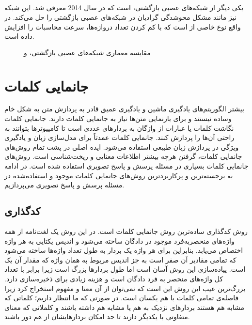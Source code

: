 \subsection{}
	یکی دیگر از شبکه‌های عصبی بازگشتی، 
	\cite{cho2014learning}
	است که در سال 2014 معرفی شد. این شبکه نیز مانند 
	مشکل محوشدگی گرادیان در شبکه‌های عصبی بازگشتی را حل می‌کند. در واقع 
	نوع خاصی از 
	است که با کم کردن تعداد دروازه‌ها، سرعت محاسبات را افزایش داده است.
	 \begin{figure}
	 	\caption[مقایسه معماری شبکه‌‌های عصبی بازگشتی،  و ]{مقایسه معماری شبکه‌‌های عصبی بازگشتی،  و \cite{rnn}}
	 	\label{fig:RNN-LSTM-GRU}
	 \end{figure}

\section{جانمایی کلمات}
	بیشتر الگوریتم‌های یادگیری ماشین و یادگیری عمیق  قادر به پردازش متن به شکل خام وساده نیستند  و برای بازنمایی متن‌ها نیاز به جانمایی کلمات 
	دارند. جانمایی کلمات نگاشت کلمات یا عبارات از واژگان به بردارهای عددی است تا کامپیوترها بتوانند به راحتی آن‌ها را پردازش کنند. جانمایی کلمات عمدتاً برای مدل‌سازی زبان و یادگیری ویژگی در پردازش زبان طبیعی استفاده می‌شود. ایده اصلی در پشت تمام روش‌های جانمایی کلمات، گرفتن هرچه بیشتر اطلاعات معنایی و ریخت‌شناسی است. روش‌های جانمایی کلمات بسیاری در مسئله پرسش و پاسخ تصویری استفاده شده است. در ادامه به برجسته‌ترین و پرکاربردترین روش‌های جانمایی کلمات موجود و استفاده‌شده در مسئله پرسش و پاسخ تصویری می‌پردازیم.
\subsection{کدگذاری }
	روش کدگذاری
	ساده‌ترین روش جانمایی کلمات است. در این روش یک لغت‌‌نامه از همه واژه‌های منحصربه‌فرد موجود در دادگان ساخته ‌می‌شود و اندیس یکتایی به هر واژه اختصاص می‌یابد. بنابراین برای هر واژه یک بردار به طول تعداد واژ‌ه‌ها ساخته می‌شود که تمامی مقادیر آن صفر است به جز اندیس مربوط به همان واژه که مقدار آن یک است. پیاده‌سازی این روش آسان است اما طول بردارها  بزرگ است زیرا برابر با تعداد کل واژه‌های منحصر به فرد دادگان است و هزینه زیادی برای ذخیره‌سازی دارد. بزرگ‌ترین عیب این روش  این است که نمی‌توان از آن معنا  و مفهوم استخراج کرد زیرا فاصله‌ی تمامی کلمات با هم یکسان است. در صورتی که ما انتظار داریم؛ کلماتی که مشابه هم هستند بردارهای نزدیک به هم یا مشابه هم داشته باشند و کلملاتی که معنای متفاوتی با یکدیگر دارند تا حد امکان بردارهایشان از هم دور باشند. 

